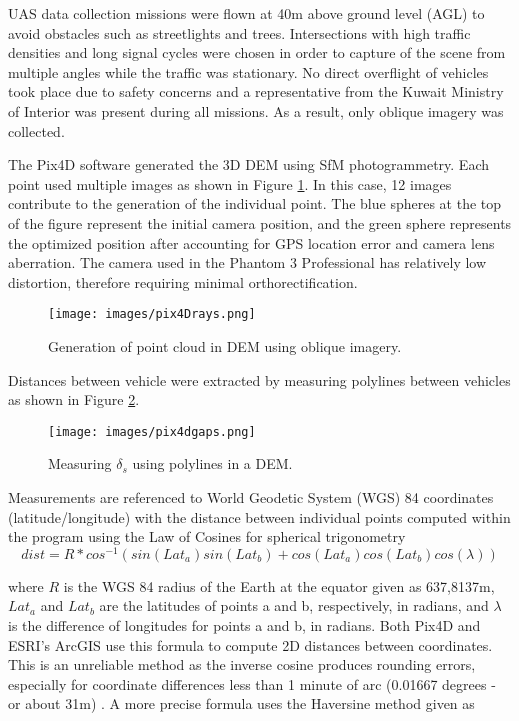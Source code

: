 \documentclass[preprint,12pt,a4paper]{elsarticle}
\begin{document}
\begin{linenumbers}
UAS data collection missions were flown at 40m above ground level (AGL) to avoid obstacles such as streetlights and trees. Intersections with high traffic densities and long signal cycles were chosen in order to capture of the scene from multiple angles while the traffic was stationary. No direct overflight of vehicles took place due to safety concerns and a representative from the Kuwait Ministry of Interior was present during all missions. As a result, only oblique imagery was collected. 

The Pix4D software generated the 3D DEM using SfM photogrammetry. Each point used multiple images as shown in Figure \ref{fig:pix4Drays}. In this case, 12 images contribute to the generation of the individual point. The blue spheres at the top of the figure represent the initial camera position, and the green sphere represents the optimized position after accounting for GPS location error and camera lens aberration. The camera used in the Phantom 3 Professional has relatively low distortion, therefore requiring minimal orthorectification.
%
\begin{figure}[H]
\texttt{[image: images/pix4Drays.png]} 
\caption{Generation of point cloud in DEM using oblique imagery.}
\label{fig:pix4Drays}
\end{figure}
%

Distances between vehicle were extracted by measuring polylines between vehicles as shown in Figure \ref{fig:pix4Dgaps}.
%
\begin{figure}[H]
\texttt{[image: images/pix4dgaps.png]} 
\caption{Measuring $\delta_{s}$ using polylines in a DEM.}
\label{fig:pix4Dgaps}
\end{figure}
%
Measurements are referenced to World Geodetic System (WGS) 84 coordinates (latitude/longitude) with the distance between individual points computed within the program using the Law of Cosines for spherical trigonometry \citep{Sinnott1984}
%
\begin{equation}
\label{eq:distTrig}
dist = R * cos^{-1}(sin(Lat_{a})sin(Lat_{b}) + cos(Lat_{a})cos(Lat_{b})cos(\lambda))
\end{equation}

\noindent
where $R$ is the WGS 84 radius of the Earth at the equator given as 637,8137m, $Lat_{a}$ and $Lat_{b}$ are the latitudes of points a and b, respectively, in radians, and $\lambda$ is the difference of longitudes for points a and b, in radians.  Both Pix4D and ESRI's ArcGIS use this formula to compute 2D distances between coordinates. This is an unreliable method as the inverse cosine produces rounding errors, especially for coordinate differences less than 1 minute of arc (0.01667 degrees - or about 31m) \citep{Sinnott1984}. A more precise formula uses the Haversine method given as 


\end{linenumbers}
\end{document}
